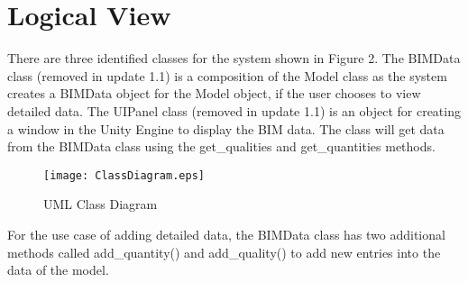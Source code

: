 \documentclass[onecolumn, draftclsnofoot,10pt, compsoc]{IEEEtran}
\begin{document}
\section{Logical View}
There are three identified classes for the system shown in Figure 2.
The BIMData class (removed in update 1.1) is a composition of the Model class as the system creates a BIMData object for the Model object, if the user chooses to view detailed data.
The UIPanel class (removed in update 1.1) is an object for creating a window in the Unity Engine to display the BIM data.
The class will get data from the BIMData class using the get\_qualities and get\_quantities methods.\par
\begin{figure}[ht]
    \centering
    \texttt{[image: ClassDiagram.eps]}
    \caption{UML Class Diagram}
    \label{fig:ClassDiagram}
\end{figure}
For the use case of adding detailed data, the BIMData class has two additional methods called add\_quantity() and add\_quality() to add new entries into the data of the model.\par
\end{document}
